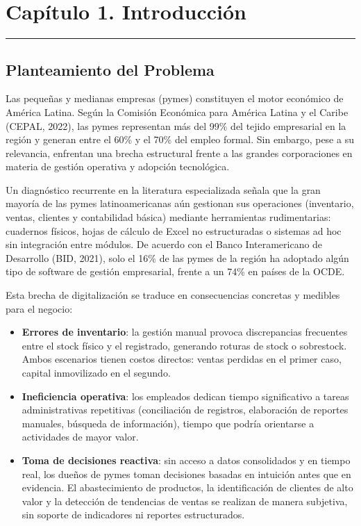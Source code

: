\chapter{Capítulo 1. Introducción}\label{capuxedtulo-1.-introducciuxf3n}

\begin{center}\rule{0.5\linewidth}{0.5pt}\end{center}

\section{Planteamiento del Problema}\label{planteamiento-del-problema}

Las pequeñas y medianas empresas (pymes) constituyen el motor económico de América Latina. Según la Comisión Económica para América Latina y el Caribe (CEPAL, 2022), las pymes representan más del 99\% del tejido empresarial en la región y generan entre el 60\% y el 70\% del empleo formal. Sin embargo, pese a su relevancia, enfrentan una brecha estructural frente a las grandes corporaciones en materia de gestión operativa y adopción tecnológica.

Un diagnóstico recurrente en la literatura especializada señala que la gran mayoría de las pymes latinoamericanas aún gestionan sus operaciones (inventario, ventas, clientes y contabilidad básica) mediante herramientas rudimentarias: cuadernos físicos, hojas de cálculo de Excel no estructuradas o sistemas ad hoc sin integración entre módulos. De acuerdo con el Banco Interamericano de Desarrollo (BID, 2021), solo el 16\% de las pymes de la región ha adoptado algún tipo de software de gestión empresarial, frente a un 74\% en países de la OCDE.

Esta brecha de digitalización se traduce en consecuencias concretas y medibles para el negocio:

\begin{itemize}
\tightlist
\item
  \textbf{Errores de inventario}: la gestión manual provoca discrepancias frecuentes entre el stock físico y el registrado, generando roturas de stock o sobrestock. Ambos escenarios tienen costos directos: ventas perdidas en el primer caso, capital inmovilizado en el segundo.
\item
  \textbf{Ineficiencia operativa}: los empleados dedican tiempo significativo a tareas administrativas repetitivas (conciliación de registros, elaboración de reportes manuales, búsqueda de información), tiempo que podría orientarse a actividades de mayor valor.
\item
  \textbf{Toma de decisiones reactiva}: sin acceso a datos consolidados y en tiempo real, los dueños de pymes toman decisiones basadas en intuición antes que en evidencia. El abastecimiento de productos, la identificación de clientes de alto valor y la detección de tendencias de ventas se realizan de manera subjetiva, sin soporte de indicadores ni reportes estructurados.
\end{itemize}

